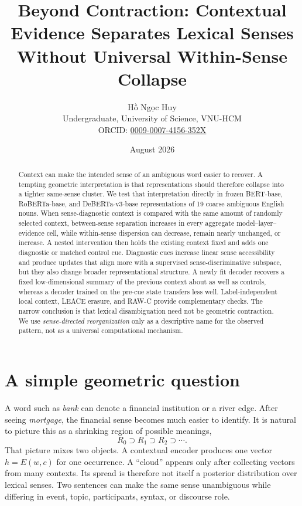 \documentclass[10pt,twocolumn]{article}
\title{\vspace{-1.5em}\textbf{Beyond Contraction: Contextual Evidence Separates Lexical Senses Without Universal Within-Sense Collapse}}
\author{Hồ Ngọc Huy\\\small Undergraduate, University of Science, VNU-HCM\\\small ORCID: \href{https://orcid.org/0009-0007-4156-352X}{0009-0007-4156-352X}}
\date{August 2026}
\begin{document}
\maketitle
\vspace{-1em}

\begin{abstract}
Context can make the intended sense of an ambiguous word easier to recover. A tempting geometric interpretation is that representations should therefore collapse into a tighter same-sense cluster. We test that interpretation directly in frozen BERT-base, RoBERTa-base, and DeBERTa-v3-base representations of 19 coarse ambiguous English nouns. When sense-diagnostic context is compared with the same amount of randomly selected context, between-sense separation increases in every aggregate model--layer--evidence cell, while within-sense dispersion can decrease, remain nearly unchanged, or increase. A nested intervention then holds the existing context fixed and adds one diagnostic or matched control cue. Diagnostic cues increase linear sense accessibility and produce updates that align more with a supervised sense-discriminative subspace, but they also change broader representational structure. A newly fit decoder recovers a fixed low-dimensional summary of the previous context about as well as controls, whereas a decoder trained on the pre-cue state transfers less well. Label-independent local context, LEACE erasure, and RAW-C provide complementary checks. The narrow conclusion is that lexical disambiguation need not be geometric contraction. We use \emph{sense-directed reorganization} only as a descriptive name for the observed pattern, not as a universal computational mechanism.
\end{abstract}

\section{A simple geometric question}
A word such as \emph{bank} can denote a financial institution or a river edge. After seeing \emph{mortgage}, the financial sense becomes much easier to identify. It is natural to picture this as a shrinking region of possible meanings,
\begin{equation}
R_0 \supset R_1 \supset R_2 \supset \cdots .
\end{equation}
That picture mixes two objects. A contextual encoder produces one vector $h=E(w,c)$ for one occurrence. A ``cloud'' appears only after collecting vectors from many contexts. Its spread is therefore not itself a posterior distribution over lexical senses. Two sentences can make the same sense unambiguous while differing in event, topic, participants, syntax, or discourse role.
\end{document}
